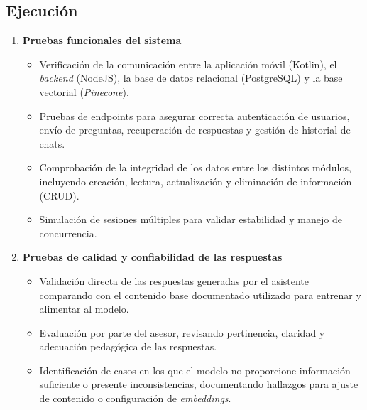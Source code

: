 \subsection{Ejecución}
\begin{enumerate}
      \item \textbf{Pruebas funcionales del sistema}
            \begin{itemize}
                  \item Verificación de la comunicación entre la aplicación móvil (Kotlin), el
                        \textit{backend} (NodeJS), la base de datos relacional (PostgreSQL) y la base
                        vectorial (\textit{Pinecone}).
                  \item Pruebas de endpoints para asegurar correcta autenticación de usuarios, envío de
                        preguntas, recuperación de respuestas y gestión de historial de chats.
                  \item Comprobación de la integridad de los datos entre los distintos módulos,
                        incluyendo creación, lectura, actualización y eliminación de información
                        (CRUD).
                  \item Simulación de sesiones múltiples para validar estabilidad y manejo de
                        concurrencia.
            \end{itemize}

      \item \textbf{Pruebas de calidad y confiabilidad de las respuestas}
            \begin{itemize}
                  \item Validación directa de las respuestas generadas por el asistente comparando con
                        el contenido base documentado utilizado para entrenar y alimentar al modelo.
                  \item Evaluación por parte del asesor, revisando pertinencia, claridad y adecuación
                        pedagógica de las respuestas.
                  \item Identificación de casos en los que el modelo no proporcione información
                        suficiente o presente inconsistencias, documentando hallazgos para ajuste de
                        contenido o configuración de \textit{embeddings}.
            \end{itemize}


\end{enumerate}
